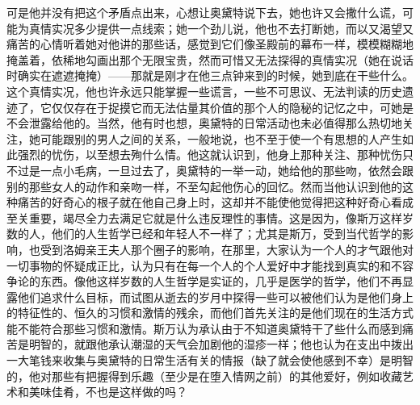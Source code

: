 \par 可是他并没有把这个矛盾点出来，心想让奥黛特说下去，她也许又会撒什么谎，可能为真情实况多少提供一点线索；她一个劲儿说，他也不去打断她，而以又渴望又痛苦的心情听着她对他讲的那些话，感觉到它们像圣殿前的幕布一样，模模糊糊地掩盖着，依稀地勾画出那个无限宝贵，然而可惜又无法探得的真情实况（她在说话时确实在遮遮掩掩）——那就是刚才在他三点钟来到的时候，她到底在干些什么。这个真情实况，他也许永远只能掌握一些谎言，一些不可思议、无法判读的历史遗迹了，它仅仅存在于捉摸它而无法估量其价值的那个人的隐秘的记忆之中，可她是不会泄露给他的。当然，他有时也想，奥黛特的日常活动也未必值得那么热切地关注，她可能跟别的男人之间的关系，一般地说，也不至于使一个有思想的人产生如此强烈的忧伤，以至想去殉什么情。他这就认识到，他身上那种关注、那种忧伤只不过是一点小毛病，一旦过去了，奥黛特的一举一动，她给他的那些吻，依然会跟别的那些女人的动作和亲吻一样，不至勾起他伤心的回忆。然而当他认识到他的这种痛苦的好奇心的根子就在他自己身上时，这却并不能使他觉得把这种好奇心看成至关重要，竭尽全力去满足它就是什么违反理性的事情。这是因为，像斯万这样岁数的人，他们的人生哲学已经和年轻人不一样了；尤其是斯万，受到当代哲学的影响，也受到洛姆亲王夫人那个圈子的影响，在那里，大家认为一个人的才气跟他对一切事物的怀疑成正比，认为只有在每一个人的个人爱好中才能找到真实的和不容争论的东西。像他这样岁数的人生哲学是实证的，几乎是医学的哲学，他们不再显露他们追求什么目标，而试图从逝去的岁月中探得一些可以被他们认为是他们身上的特征性的、恒久的习惯和激情的残余，而他们首先关注的是他们现在的生活方式能不能符合那些习惯和激情。斯万认为承认由于不知道奥黛特干了些什么而感到痛苦是明智的，就跟他承认潮湿的天气会加剧他的湿疹一样；他也认为在支出中拨出一大笔钱来收集与奥黛特的日常生活有关的情报（缺了就会使他感到不幸）是明智的，他对那些有把握得到乐趣（至少是在堕入情网之前）的其他爱好，例如收藏艺术和美味佳肴，不也是这样做的吗？
